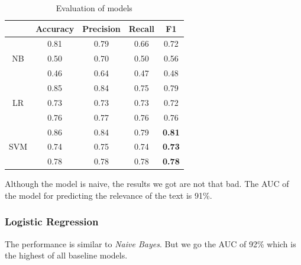 \documentclass[11pt,a4paper]{article}
\begin{document}
\begin{table}[h]
    \centering
    \begin{tabular}{c | c c c c}
         & Accuracy & Precision & Recall & F1 \\ 
    \hline
    \multirow{3}{*}{NB} & 0.81 & 0.79 & 0.66 & 0.72 \\
                & 0.50 & 0.70 & 0.50 & 0.56 \\
                & 0.46 & 0.64 & 0.47 & 0.48 \\
    \hline
    \multirow{3}{*}{LR} & 0.85 & 0.84 & 0.75 & 0.79 \\
                & 0.73 & 0.73 & 0.73 & 0.72 \\
                & 0.76 & 0.77 & 0.76 & 0.76 \\
    \hline
    \multirow{3}{*}{SVM} & 0.86 & 0.84 & 0.79 & \textbf{0.81} \\
                & 0.74 & 0.75 & 0.74 & \textbf{0.73} \\
                & 0.78 & 0.78 & 0.78 & \textbf{0.78} \\
    
    \end{tabular}
    \caption{Evaluation of models}
    \label{tab:tab1}
\end{table}



Although the model is naive, the results we got are not that bad.
The AUC of the model for predicting the relevance of the text is 91\%.

\subsubsection{Logistic Regression}


The performance is similar to \textit{Naive Bayes}.
But we go the AUC of 92\% which is the highest of all baseline models.
\end{document}
